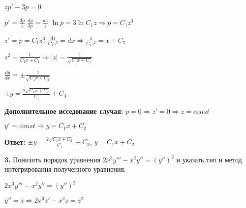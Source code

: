 \documentclass[a4paper]{article}
\begin{document}
$\displaystyle zp'-3p=0$

\vspace{0.3cm}

$\displaystyle p'=\frac{3p}{z}$ \hspace{1cm} $\displaystyle \frac{dp}{3p}=\frac{dz}{z}$ \hspace{1cm} $\displaystyle \ln{p}=3\ln{C_1 z} \Rightarrow p=C_1 z^3$

\vspace{0.3cm}

$\displaystyle  z'=p=C_1 z^3$ \hspace{1cm} $\displaystyle  \frac{dz}{C_1z^3}=dx \Rightarrow \frac{1}{C_1z^2}=x+C_2$

\vspace{0.3cm}

$\displaystyle z^2=\frac{1}{C_1x+C_2} \Rightarrow |z|=\frac{1}{\sqrt{C_1 x+C_2}}$

\vspace{0.3cm}

$\displaystyle \frac{dy}{dx}=\pm\frac{1}{\sqrt{C_1 x + C_2}}$

\vspace{0.3cm}

$\displaystyle \pm y=\frac{2\sqrt{C_1 x + C_2}}{C_1}+C_3$

\vspace{0.3cm}

\textbf{Дополнительное исседование случая:} $\displaystyle p=0 \Rightarrow z'=0 \Rightarrow z=const$

\vspace{0.3cm}

$\displaystyle y'=const \Rightarrow y=C_1 x+ C_2$
     
\vspace{0.3cm}

\textbf{Ответ: } $\displaystyle \pm y=\frac{2\sqrt{C_1 x + C_2}}{C_1}+C_3$, $\displaystyle y=C_1 x+ C_2$

\vspace{1cm}

\textbf{3.} Понизить порядок уравнения $\displaystyle 2x^3y'''-x^2y''=(y'')^2$ и указать тип  и метод интегрирования полученного уравнения.

\vspace{0.3cm}

$\displaystyle 2x^3y'''-x^2y''=(y'')^2$

\vspace{0.3cm}

$\displaystyle y''=z \Rightarrow 2x^3z'-x^2z=z^2$
\end{document}
